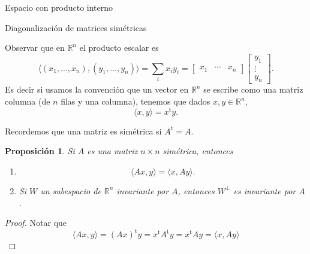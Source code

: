 \documentclass[a4paper,12pt,twoside,spanish,reqno]{amsbook}
\newtheorem{proposicion}[teorema]{Proposici\'on}
\theoremstyle{definition}
\newtheorem{definicion}{Definici\'on}[section]
\theoremstyle{remark}
\newcommand{\la}{\langle}
\newcommand{\ra}{\rangle}
\renewcommand{\t}{{\operatorname{t}}}
\newcommand{\R}{\mathbb R}
\begin{document}
\begin{chapter}{Espacio con producto interno}



\begin{section}{Diagonalización de matrices simétricas}
	

	
	
	Observar que en $\R^n$ el producto escalar es 
	\begin{equation*}
		\la (x_1,\ldots,x_n),(y_1,\ldots,y_n)  \ra = \sum_i x_iy_i = \begin{bmatrix} x_1& \cdots &x_n\end{bmatrix}\begin{bmatrix} y_1 \\ \vdots \\ y_n \end{bmatrix}.
	\end{equation*}
	Es decir si usamos la convención que un vector en $\R^n$  se escribe como una matriz columna (de $n$ filas y una columna),  tenemos que dados $x,y \in \R^n$, 
	\begin{equation*}
		\la x,y \ra = x^\t y.
	\end{equation*}
	
	Recordemos que una matriz es simétrica si $A^\t =A$. 
	
\begin{proposicion}
	Si $A$ es una matriz $n \times n$ simétrica, entonces 
	\begin{enumerate}[label=\emph{\alph*})]
		\item 
		\begin{equation*}
		\la Ax,y \ra =  \la x,Ay \ra .
		\end{equation*}
		\item Si $W$ un subespacio de $\R^n$ invariante por $A$, entonces $W^\perp$ es invariante por $A$.
	\end{enumerate}
\end{proposicion}
\begin{proof}
	Notar que
	\begin{equation*}
	\la Ax,y \ra = (Ax)^\t y = x^\t A^\t y  = x^\t A y = \la x,Ay \ra 
	\end{equation*}
\end{proof}
	

\end{section}
\end{chapter}
\end{document}
